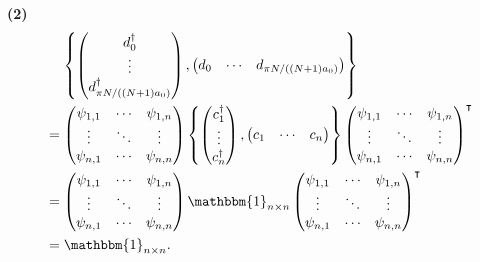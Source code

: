 \documentclass{article}
\makeatletter
\newcommand*{\shifttext}[1]{%
  \settowidth{\@tempdima}{#1}%
  \hspace{-\@tempdima}#1%
}
\newcommand{\plabel}[1]{%
\shifttext{\textbf{#1}\quad}%
}
\newcommand{\minusbaseline}{\abovedisplayskip=0pt\abovedisplayshortskip=0pt~\vspace*{-\baselineskip}}%
\makeatother
\begin{document}
\plabel{(2)}%
\begingroup\minusbaseline%
\begin{align*}
  &\phantom{{}={}}\qty{\begin{pmatrix}
    d^\dagger_0 \\ \vdots \\ d^\dagger_{\pi N / ((N+1)a_0)}
  \end{pmatrix}, \begin{pmatrix}
    d_0 & \cdots & d_{\pi N / ((N+1)a_0)}
  \end{pmatrix}} \\
  &= \begin{pmatrix}
    \psi_{1,1} & \cdots & \psi_{1,n} \\
    \vdots & \ddots & \vdots \\
    \psi_{n,1} & \cdots & \psi_{n,n}
  \end{pmatrix} \qty{\begin{pmatrix}
    c^\dagger_1 \\ \vdots \\ c^\dagger_n
  \end{pmatrix}, \begin{pmatrix}
    c_1 & \cdots & c_n
  \end{pmatrix}} \begin{pmatrix}
    \psi_{1,1} & \cdots & \psi_{1,n} \\
    \vdots & \ddots & \vdots \\
    \psi_{n,1} & \cdots & \psi_{n,n}
  \end{pmatrix}^\intercal \\
  &= \begin{pmatrix}
    \psi_{1,1} & \cdots & \psi_{1,n} \\
    \vdots & \ddots & \vdots \\
    \psi_{n,1} & \cdots & \psi_{n,n}
  \end{pmatrix} \mathbbm{1}_{n\times n} \begin{pmatrix}
    \psi_{1,1} & \cdots & \psi_{1,n} \\
    \vdots & \ddots & \vdots \\
    \psi_{n,1} & \cdots & \psi_{n,n}
  \end{pmatrix}^\intercal \\
  &= \mathbbm{1}_{n\times n}.
\end{align*}
\endgroup
\end{document}
